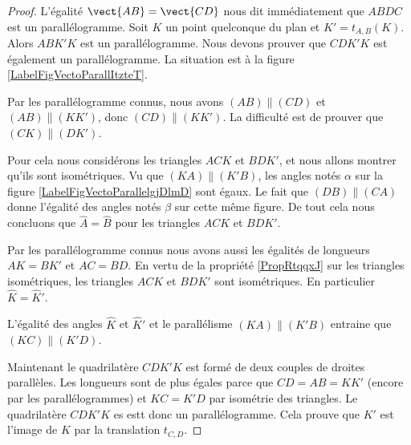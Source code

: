 \begin{proof}
    L'égalité \( \vect{ AB }=\vect{ CD }\) nous dit immédiatement que \( ABDC\) est un parallélogramme. Soit \( K\) un point quelconque du plan et \( K'=t_{A,B}(K)\). Alors \( ABK'K\) est un parallélogramme. Nous devons prouver que \( CDK'K\) est également un parallélogramme. La situation est à la figure \ref{LabelFigVectoParallItzteT}. %
\newcommand{\CaptionFigVectoParallItzteT}{Nous savons que \( ABDC\) et \( CDK'K\) sont des parallélogramme, et nous voulons déduire que \( CDK'K\) en est également un.}


    Par les parallélogramme connus, nous avons \( (AB)\parallel (CD)\) et \( (AB)\parallel (KK')\), donc \( (CD)\parallel (KK')\). La difficulté est de prouver que \( (CK)\parallel (DK')\). 
    
    Pour cela nous considérons les triangles \( ACK\) et \( BDK'\), et nous allons montrer qu'ils sont isométriques. Vu que \( (KA)\parallel (K'B)\), les angles notés \( \alpha\) sur la figure \ref{LabelFigVectoParallelgjDlmD} sont égaux. Le fait que \( (DB)\parallel (CA)\) donne l'égalité des angles notés \( \beta\) sur cette même figure. De tout cela nous concluons que \( \hat A=\hat B\) pour les triangles \( ACK\) et \( BDK'\).
\newcommand{\CaptionFigVectoParallelgjDlmD}{Égalité de quelque angles.}


    Par les parallélogramme connus nous avons aussi les égalités de longueurs \( AK=BK'\) et \( AC=BD\). En vertu de la propriété \ref{PropRtqqxJ} sur les triangles isométriques, les triangles \( ACK\) et \( BDK'\) sont isométriques. En particulier \( \hat K=\hat K'\).

    L'égalité des angles \( \hat K\) et \( \hat K'\) et le parallélisme \( (KA)\parallel (K'B)\) entraine que \( (KC)\parallel(K'D)\).

    Maintenant le quadrilatère \( CDK'K\) est formé de deux couples de droites parallèles. Les longueurs sont de plus égales parce que \( CD=AB=KK'\) (encore par les parallélogrammes) et \( KC=K'D\) par isométrie des triangles. Le quadrilatère \( CDK'K\) es estt donc un parallélogramme. Cela prouve que \( K'\) est l'image de \( K\) par la translation \( t_{C,D}\).
\end{proof}

